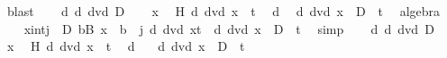 \begin{isabellebody}
\ blast\isanewline
{}\isamarkupfalse%
\isanewline
\ \ \isamarkupfalse%
\ d{\isacharcolon}{\kern0pt}\ {\isachardoublequoteopen}d\ dvd\ D{\isachardoublequoteclose}\isanewline
\ \ \isacommand{{\isacharbraceleft}{\kern0pt}}\isamarkupfalse%
\isamarkupfalse%
\ x\ \isamarkupfalse%
\ H{\isacharcolon}{\kern0pt}\ {\isachardoublequoteopen}d\ dvd\ x\ {\isacharplus}{\kern0pt}\ t{\isachardoublequoteclose}\ \isamarkupfalse%
\ d\ \isamarkupfalse%
\ {\isachardoublequoteopen}d\ dvd\ {\isacharparenleft}{\kern0pt}x\ {\isacharminus}{\kern0pt}\ D{\isacharparenright}{\kern0pt}\ {\isacharplus}{\kern0pt}\ t{\isachardoublequoteclose}\ \isamarkupfalse%
\ algebra\isacommand{{\isacharbraceright}{\kern0pt}}\isamarkupfalse%
\isanewline
\ \ \isamarkupfalse%
\ {\isachardoublequoteopen}{\isasymforall}{\isacharparenleft}{\kern0pt}x{\isacharcolon}{\kern0pt}{\isacharcolon}{\kern0pt}int{\isacharparenright}{\kern0pt}{\isachardot}{\kern0pt}{\isacharparenleft}{\kern0pt}{\isasymforall}j{\isasymin}{\isacharbraceleft}{\kern0pt}{}\ {\isachardot}{\kern0pt}{\isachardot}{\kern0pt}\ D{\isacharbraceright}{\kern0pt}{\isachardot}{\kern0pt}\ {\isasymforall}b{\isasymin}B{\isachardot}{\kern0pt}\ x\ {\isasymnoteq}\ b\ {\isacharplus}{\kern0pt}\ j{\isacharparenright}{\kern0pt}{\isasymlongrightarrow}\ {\isacharparenleft}{\kern0pt}d\ dvd\ x{\isacharplus}{\kern0pt}t{\isacharparenright}{\kern0pt}\ {\isasymlongrightarrow}\ {\isacharparenleft}{\kern0pt}d\ dvd\ {\isacharparenleft}{\kern0pt}x\ {\isacharminus}{\kern0pt}\ D{\isacharparenright}{\kern0pt}\ {\isacharplus}{\kern0pt}\ t{\isacharparenright}{\kern0pt}{\isachardoublequoteclose}\ \isamarkupfalse%
\ simp\isanewline
{}\isamarkupfalse%
\isanewline
\ \ \isamarkupfalse%
\ d{\isacharcolon}{\kern0pt}\ {\isachardoublequoteopen}d\ dvd\ D{\isachardoublequoteclose}\isanewline
\ \ \isacommand{{\isacharbraceleft}{\kern0pt}}\isamarkupfalse%
\isamarkupfalse%
\ x\ \isamarkupfalse%
\ H{\isacharcolon}{\kern0pt}\ {\isachardoublequoteopen}{\isasymnot}{\isacharparenleft}{\kern0pt}d\ dvd\ x\ {\isacharplus}{\kern0pt}\ t{\isacharparenright}{\kern0pt}{\isachardoublequoteclose}\ \isamarkupfalse%
\ d\ \isamarkupfalse%
\ {\isachardoublequoteopen}{\isasymnot}\ d\ dvd\ {\isacharparenleft}{\kern0pt}x\ {\isacharminus}{\kern0pt}\ D{\isacharparenright}{\kern0pt}\ {\isacharplus}{\kern0pt}\ t{\isachardoublequoteclose}\isanewline
\ \ \ \ \ \ \isamarkupfalse%

\end{isabellebody}
